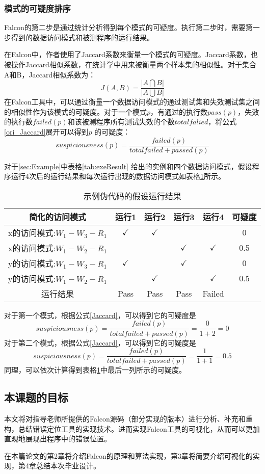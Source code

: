 \subsubsection{模式的可疑度排序}\label{sec:rankPattern}
Falcon的第二步是通过统计分析得到每个模式的可疑度。执行第二步时，需要第一步得到的数据访问模式和被测程序的运行结果。\par
在Falcon中，作者使用了Jaccard系数来衡量一个模式的可疑度。Jaccard系数，也被操作Jaccard相似系数，在统计学中用来被衡量两个样本集的相似性。对于集合A和B，Jaccard相似系数为：
\begin{equation}\label{ori_Jaccard}
  J(A,B)=\frac{|A\bigcap B|}{|A\bigcup B|}
\end{equation}
在Falcon工具中，可以通过衡量一个数据访问模式的通过测试集和失效测试集之间的相似性作为该模式的可疑度。对于一个模式$p$，有通过的执行数$pass(p)$，失效的执行数$failed(p)$和该被测程序所有测试失效的个数$totalfalied$，将公式\ref{ori_Jaccard}展开可以得到$p$ 的可疑度：
\begin{equation}\label{Jaccard}
    suspiciousness(p)=\frac{failed(p)}{totalfailed + passed(p)}
\end{equation}\par
对于\ref{sec:Example}中表格\ref{tab:exeResult} 给出的实例和四个数据访问模式，假设程序运行4次后的运行结果和每次运行出现的数据访问模式如表格\ref{tab:Exampleresult}所示。
\begin{table}[!ht]
  \centering
  \caption{示例伪代码的假设运行结果}\label{tab:Exampleresult}
  \begin{tabular}{|c|c|c|c|c|c|}
     \hline
     简化的访问模式            & 运行1        & 运行2        & 运行3 & 运行4 & 可疑度 \\\hline
     x的访问模式:$W_1-W_3-R_1$ & $\checkmark$ & $\checkmark$ &       &       & 0 \\\hline
     x的访问模式:$W_1-W_2-R_1$ &              &              & $\checkmark$   & $\checkmark$   & 0.5 \\\hline
     y的访问模式:$W_1-W_3-R_1$ & $\checkmark$ &              & $\checkmark$   &       & 0 \\\hline
     y的访问模式:$W_1-W_2-R_1$ &              & $\checkmark$ &       & $\checkmark$   & 0.5 \\\hline
     运行结果                  & Pass         & Pass         & Pass  & Failed&  \\
     \hline
   \end{tabular}
\end{table}
对于第一个模式，根据公式\ref{Jaccard}，可以得到它的可疑度是
\[
  suspiciousness(p)=\frac{failed(p)}{totalfailed + passed(p)}=\frac{0}{1+2}=0
\]
对于第二个模式，根据公式\ref{Jaccard}，可以得到它的可疑度是
\[
  suspiciousness(p)=\frac{failed(p)}{totalfailed + passed(p)}=\frac{1}{1+1}=0.5
\]
同理，可以依次计算得到表格\ref{tab:Exampleresult}中最后一列所示的可疑度。
\subsection{本课题的目标}
本文将对指导老师所提供的Falcon源码（部分实现的版本）进行分析、补充和重构，总结错误定位工具的实现技术。进而实现Falcon工具的可视化，从而可以更加直观地展现出程序中的错误位置。\par
在本篇论文的第2章将介绍Falcon的原理和算法实现，第3章将简要介绍可视化的实现，第4章总结本次毕业设计。

